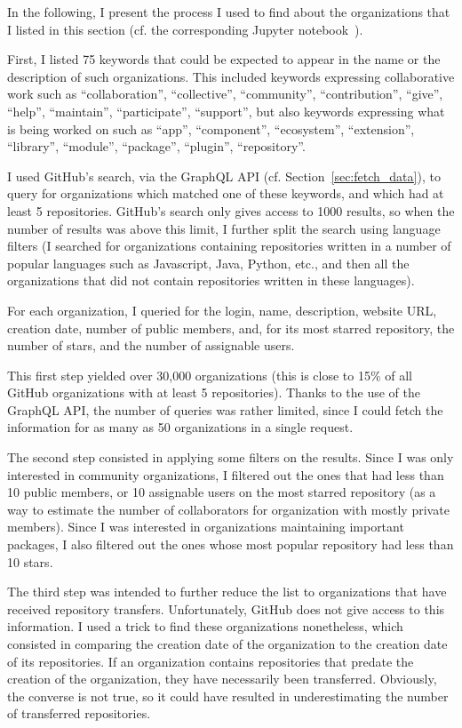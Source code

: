 In the following, I present the process I used to find about the organizations that I listed in this section (cf. the corresponding Jupyter notebook~\cite{zimmermann2019community}).

First, I listed 75 keywords that could be expected to appear in the name or the description of such organizations.
This included keywords expressing collaborative work such as ``collaboration'', ``collective'', ``community'', ``contribution'', ``give'', ``help'', ``maintain'', ``participate'', ``support'', but also keywords expressing what is being worked on such as ``app'', ``component'', ``ecosystem'', ``extension'', ``library'', ``module'', ``package'', ``plugin'', ``repository''.

I used GitHub's search, via the GraphQL API (cf. Section~\ref{sec:fetch_data}), to query for organizations which matched one of these keywords, and which had at least 5 repositories.
GitHub's search only gives access to 1000 results, so when the number of results was above this limit, I further split the search using language filters (I searched for organizations containing repositories written in a number of popular languages such as Javascript, Java, Python, etc., and then all the organizations that did not contain repositories written in these languages).

For each organization, I queried for the login, name, description, website URL, creation date, number of public members, and, for its most starred repository, the number of stars, and the number of assignable users.

This first step yielded over 30,000 organizations (this is close to 15\% of all GitHub organizations with at least 5 repositories).
Thanks to the use of the GraphQL API, the number of queries was rather limited, since I could fetch the information for as many as 50 organizations in a single request.

The second step consisted in applying some filters on the results.
Since I was only interested in community organizations, I filtered out the ones that had less than 10 public members, or 10 assignable users on the most starred repository (as a way to estimate the number of collaborators for organization with mostly private members).
Since I was interested in organizations maintaining important packages, I also filtered out the ones whose most popular repository had less than 10 stars.

The third step was intended to further reduce the list to organizations that have received repository transfers.
Unfortunately, GitHub does not give access to this information.
I used a trick to find these organizations nonetheless, which consisted in comparing the creation date of the organization to the creation date of its repositories.
If an organization contains repositories that predate the creation of the organization, they have necessarily been transferred.
Obviously, the converse is not true, so it could have resulted in underestimating the number of transferred repositories.


